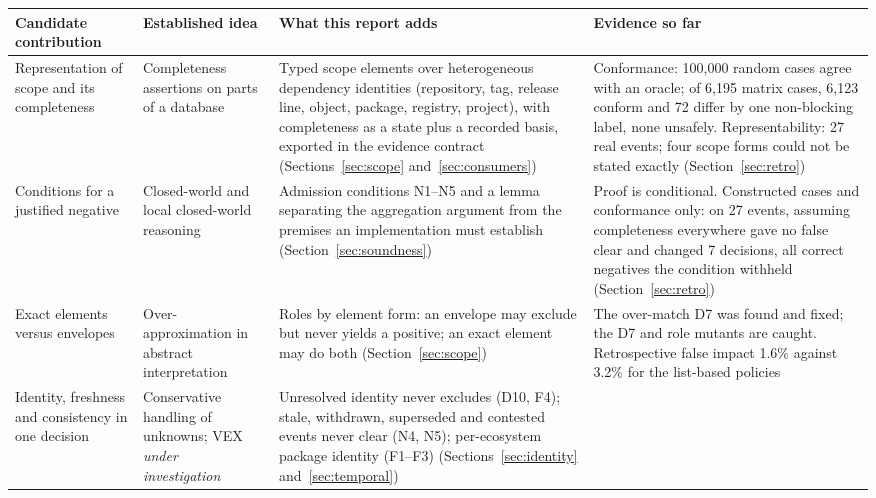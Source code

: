 \documentclass[11pt,a4paper]{article}
\begin{document}
\begin{table}[t]
\centering
\footnotesize
\setlength{\tabcolsep}{4pt}
\begin{tabularx}{\linewidth}{@{}>{\raggedright\arraybackslash}p{2.4cm} >{\raggedright\arraybackslash}p{2.4cm} >{\raggedright\arraybackslash}X >{\raggedright\arraybackslash}p{3.3cm}@{}}
\toprule
Candidate contribution & Established idea & What this report adds & Evidence so far \\
\midrule
Representation of scope and its completeness &
  Completeness assertions on parts of a
  database~\cite{motro1989integrity,levy1996obtaining} &
  Typed scope elements over heterogeneous dependency identities
  (repository, tag, release line, object, package, registry, project),
  with completeness as a state plus a recorded basis, exported in the
  evidence contract (Sections~\ref{sec:scope}
  and~\ref{sec:consumers}) &
  Conformance: 100{,}000 random cases agree with an oracle; of 6{,}195
  matrix cases, 6{,}123 conform and 72 differ by one non-blocking
  label, none unsafely. Representability: 27 real events; four scope forms
  could not be stated exactly (Section~\ref{sec:retro}) \\
Conditions for a justified negative &
  Closed-world and local closed-world
  reasoning~\cite{reiter1978closed,etzioni1997closed} &
  Admission conditions N1--N5 and a lemma separating the aggregation
  argument from the premises an implementation must establish
  (Section~\ref{sec:soundness}) &
  Proof is conditional. Constructed cases and conformance only: on 27
  events, assuming completeness everywhere gave no false clear and
  changed 7 decisions, all correct negatives the condition withheld
  (Section~\ref{sec:retro}) \\
Exact elements versus envelopes &
  Over-approximation in abstract
  interpretation~\cite{cousot1977abstract} &
  Roles by element form: an envelope may exclude but never yields a
  positive; an exact element may do both (Section~\ref{sec:scope}) &
  The over-match D7 was found and fixed; the D7 and role mutants are
  caught. Retrospective false impact 1.6\% against 3.2\% for the
  list-based policies \\
Identity, freshness and consistency in one decision &
  Conservative handling of unknowns; VEX \emph{under
  investigation}~\cite{cisa2023vex} &
  Unresolved identity never excludes (D10, F4); stale, withdrawn,
  superseded and contested events never clear (N4, N5); per-ecosystem
  package identity (F1--F3) (Sections~\ref{sec:identity}
  and~\ref{sec:temporal}) &

\end{tabularx}
\end{table}
\end{document}
